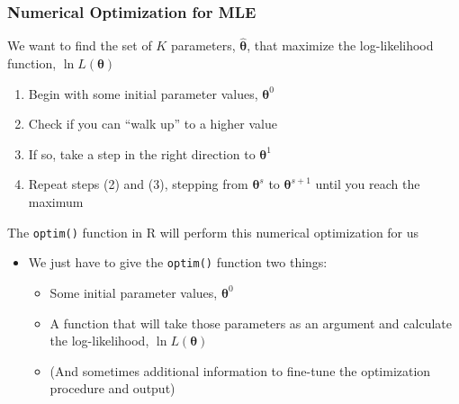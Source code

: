 \documentclass{beamer}\usepackage[]{graphicx}\usepackage[]{color}
\begin{document}
\begin{frame}\frametitle{Numerical Optimization for MLE}
    We want to find the set of $K$ parameters, $\widehat{\bm{\theta}}$, that maximize the log-likelihood function, $\ln L(\bm{\theta})$
    \begin{enumerate}
        \item Begin with some initial parameter values, $\bm{\theta}^0$
        \item Check if you can ``walk up'' to a higher value
        \item If so, take a step in the right direction to $\bm{\theta}^1$
        \item Repeat steps (2) and (3), stepping from $\bm{\theta}^s$ to $\bm{\theta}^{s + 1}$ until you reach the maximum
    \end{enumerate}
    \vspace{3ex}
    The \texttt{optim()} function in R will perform this numerical optimization for us
    \begin{itemize}
        \item We just have to give the \texttt{optim()} function two things:
        \begin{itemize}
            \item Some initial parameter values, $\bm{\theta}^0$
            \item A function that will take those parameters as an argument and calculate the log-likelihood, $\ln L(\bm{\theta})$
            \item (And sometimes additional information to fine-tune the optimization procedure and output)
        \end{itemize}
    \end{itemize}
\end{frame}
\end{document}
